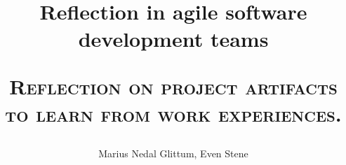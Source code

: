\documentclass[a4paper, 12pt]{report}
\title{Reflection in agile software development teams
    \begin{center}
        \textsc{Reflection on project artifacts to learn from work experiences.}
    \end{center}
}
\author{Marius Nedal Glittum, Even Stene}
\begin{document}
\maketitle
{}





\tableofcontents

\listoffigures

\clearpage
{} 












%













\begin{appendices}
	
    
    
    
    
    
    
\end{appendices}





\end{document}

